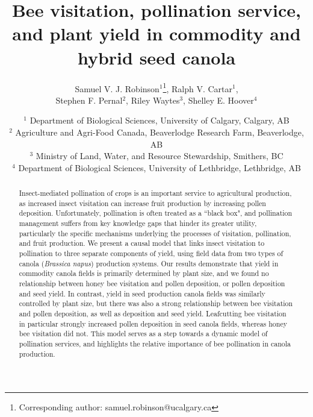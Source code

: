 \documentclass[12pt]{article} %
\title{Bee visitation, pollination service, and plant yield in commodity and hybrid seed canola}
\author{Samuel V. J. Robinson$^1$\footnote{Corresponding author: samuel.robinson@ucalgary.ca}, Ralph V. Cartar$^1$,\\Stephen F. Pernal$^2$, Riley Waytes$^3$, Shelley E. Hoover$^4$}
\date{
$^1$ Department of Biological Sciences, University of Calgary, Calgary, AB\\
$^2$ Agriculture and Agri-Food Canada, Beaverlodge Research Farm, Beaverlodge, AB\\
$^3$ Ministry of Land, Water, and Resource Stewardship, Smithers, BC\\
$^4$ Department of Biological Sciences, University of Lethbridge, Lethbridge, AB
}
\begin{document}
\maketitle
\doublespacing

\begin{abstract}
Insect-mediated pollination of crops is an important service to agricultural production, as increased insect visitation can increase fruit production by increasing pollen deposition.
Unfortunately, pollination is often treated as a ``black box", and pollination management suffers from key knowledge gaps that hinder its greater utility, particularly the specific mechanisms underlying the processes of visitation, pollination, and fruit production.
We present a causal model that links insect visitation to pollination to three separate components of yield, using field data from two types of canola (\emph{Brassica napus}) production systems. 
Our results demonstrate that yield in commodity canola fields is primarily determined by plant size, and we found no relationship between honey bee visitation and pollen deposition, or pollen deposition and seed yield. 
In contrast, yield in seed production canola fields was similarly controlled by plant size, but there was also a strong relationship between bee visitation and pollen deposition, as well as deposition and seed yield. 
Leafcutting bee visitation in particular strongly increased pollen deposition in seed canola fields, whereas honey bee visitation did not. 
This model serves as a step towards a dynamic model of pollination services, and highlights the relative importance of bee pollination in canola production.
\end{abstract}




\end{document}
